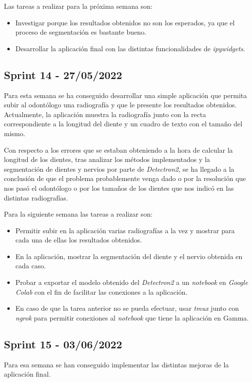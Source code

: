 Las tareas a realizar para la próxima semana son:
\begin{itemize}
    \item Investigar porque los resultados obtenidos no son los esperados, ya que el proceso de segmentación es bastante bueno.
    \item Desarrollar la aplicación final con las distintas funcionalidades de \emph{ipywidgets}.
\end{itemize}
\subsection{Sprint 14 - 27/05/2022}
Para esta semana se ha conseguido desarrollar una simple aplicación que permita subir al odontólogo una radiografía y que le presente los resultados obtenidos. Actualmente, la aplicación muestra la radiografía junto con la recta correspondiente a la longitud del diente y un cuadro de texto con el tamaño del mismo.

Con respecto a los errores que se estaban obteniendo a la hora de calcular la longitud de los dientes, tras analizar los métodos implementados y la segmentación de dientes y nervios por parte de \emph{Detectron2}, se ha llegado a la conclusión de que el problema probablemente venga dado o por la resolución que nos pasó el odontólogo o por los tamaños de los dientes que nos indicó en las distintas radiografías.

Para la siguiente semana las tareas a realizar son:
\begin{itemize}
    \item Permitir subir en la aplicación varias radiografías a la vez y mostrar para cada una de ellas los resultados obtenidos.
    \item En la aplicación, mostrar la segmentación del diente y el nervio obtenida en cada caso.
    \item Probar a exportar el modelo obtenido del \emph{Detectron2} a un \emph{notebook} en \emph{Google Colab} con el fin de facilitar las conexiones a la aplicación.
    \item En caso de que la tarea anterior no se pueda efectuar, usar \emph{tmux} junto con \emph{ngrok} para permitir conexiones al \emph{notebook} que tiene la aplicación en Gamma.
\end{itemize}
\subsection{Sprint 15 - 03/06/2022}
Para esa semana se han conseguido implementar las distintas mejoras de la aplicación final. 

